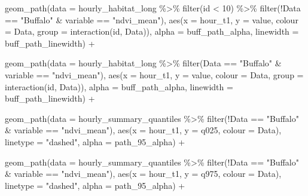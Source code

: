 \documentclass[
  letterpaper,
  DIV=11,
  numbers=noendperiod]{scrartcl}
\newenvironment{Shaded}{\begin{snugshade}}{\end{snugshade}}
\newcommand{\AttributeTok}[1]{\textcolor[rgb]{0.40,0.45,0.13}{#1}}
\newcommand{\DecValTok}[1]{\textcolor[rgb]{0.68,0.00,0.00}{#1}}
\newcommand{\FunctionTok}[1]{\textcolor[rgb]{0.28,0.35,0.67}{#1}}
\newcommand{\NormalTok}[1]{\textcolor[rgb]{0.00,0.23,0.31}{#1}}
\newcommand{\SpecialCharTok}[1]{\textcolor[rgb]{0.37,0.37,0.37}{#1}}
\newcommand{\StringTok}[1]{\textcolor[rgb]{0.13,0.47,0.30}{#1}}
\begin{document}
\begin{Shaded}
\begin{Highlighting}[]
  
  \FunctionTok{geom\_path}\NormalTok{(}\AttributeTok{data =}\NormalTok{ hourly\_habitat\_long }\SpecialCharTok{\%\textgreater{}\%} \FunctionTok{filter}\NormalTok{(id }\SpecialCharTok{\textless{}} \DecValTok{10}\NormalTok{) }\SpecialCharTok{\%\textgreater{}\%} 
              \FunctionTok{filter}\NormalTok{(}\SpecialCharTok{!}\NormalTok{Data }\SpecialCharTok{==} \StringTok{"Buffalo"} \SpecialCharTok{\&}\NormalTok{ variable }\SpecialCharTok{==} \StringTok{"ndvi\_mean"}\NormalTok{),}
                 \FunctionTok{aes}\NormalTok{(}\AttributeTok{x =}\NormalTok{ hour\_t1, }\AttributeTok{y =}\NormalTok{ value, }\AttributeTok{colour =}\NormalTok{ Data, }\AttributeTok{group =} \FunctionTok{interaction}\NormalTok{(id, Data)),}
                 \AttributeTok{alpha =}\NormalTok{ buff\_path\_alpha,}
              \AttributeTok{linewidth =}\NormalTok{ buff\_path\_linewidth) }\SpecialCharTok{+}
  
  
  \FunctionTok{geom\_path}\NormalTok{(}\AttributeTok{data =}\NormalTok{ hourly\_habitat\_long }\SpecialCharTok{\%\textgreater{}\%} 
              \FunctionTok{filter}\NormalTok{(Data }\SpecialCharTok{==} \StringTok{"Buffalo"} \SpecialCharTok{\&}\NormalTok{ variable }\SpecialCharTok{==} \StringTok{"ndvi\_mean"}\NormalTok{),}
                 \FunctionTok{aes}\NormalTok{(}\AttributeTok{x =}\NormalTok{ hour\_t1, }\AttributeTok{y =}\NormalTok{ value, }\AttributeTok{colour =}\NormalTok{ Data, }\AttributeTok{group =} \FunctionTok{interaction}\NormalTok{(id, Data)),}
                 \AttributeTok{alpha =}\NormalTok{ buff\_path\_alpha,}
              \AttributeTok{linewidth =}\NormalTok{ buff\_path\_linewidth) }\SpecialCharTok{+}

  \FunctionTok{geom\_path}\NormalTok{(}\AttributeTok{data =}\NormalTok{ hourly\_summary\_quantiles }\SpecialCharTok{\%\textgreater{}\%} 
              \FunctionTok{filter}\NormalTok{(}\SpecialCharTok{!}\NormalTok{Data }\SpecialCharTok{==} \StringTok{"Buffalo"} \SpecialCharTok{\&}\NormalTok{ variable }\SpecialCharTok{==} \StringTok{"ndvi\_mean"}\NormalTok{),}
              \FunctionTok{aes}\NormalTok{(}\AttributeTok{x =}\NormalTok{ hour\_t1, }\AttributeTok{y =}\NormalTok{ q025, }\AttributeTok{colour =}\NormalTok{ Data),}
            \AttributeTok{linetype =} \StringTok{"dashed"}\NormalTok{,}
              \AttributeTok{alpha =}\NormalTok{ path\_95\_alpha) }\SpecialCharTok{+}

  \FunctionTok{geom\_path}\NormalTok{(}\AttributeTok{data =}\NormalTok{ hourly\_summary\_quantiles }\SpecialCharTok{\%\textgreater{}\%} 
              \FunctionTok{filter}\NormalTok{(}\SpecialCharTok{!}\NormalTok{Data }\SpecialCharTok{==} \StringTok{"Buffalo"} \SpecialCharTok{\&}\NormalTok{ variable }\SpecialCharTok{==} \StringTok{"ndvi\_mean"}\NormalTok{),}
              \FunctionTok{aes}\NormalTok{(}\AttributeTok{x =}\NormalTok{ hour\_t1, }\AttributeTok{y =}\NormalTok{ q975, }\AttributeTok{colour =}\NormalTok{ Data),}
            \AttributeTok{linetype =} \StringTok{"dashed"}\NormalTok{,}
              \AttributeTok{alpha =}\NormalTok{ path\_95\_alpha) }\SpecialCharTok{+}
  

\end{Highlighting}
\end{Shaded}
\end{document}
